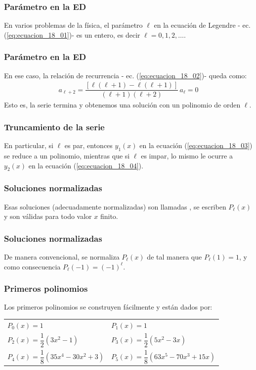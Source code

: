 \documentclass[12pt]{beamer}
\begin{document}
\begin{frame}
\frametitle{Parámetro en la ED}
En varios problemas de la física, el parámetro $\ell$ en la ecuación de Legendre - ec. (\ref{eq:ecuacion_18_01})- es un entero, es decir $\ell = 0,1,2,\ldots$.
\end{frame}
\begin{frame}
\frametitle{Parámetro en la ED}
En ese caso, la relación de recurrencia - ec. (\ref{eq:ecuacion_18_02})- queda como:
\pause
\begin{align*}
a_{\ell + 2} = \dfrac{[ \ell (\ell + 1) - \ell (\ell + 1) ]}{(\ell + 1)(\ell + 2)} \, a_{\ell} = 0
\end{align*}
Esto es, la serie termina y obtenemos una solución con un polinomio de orden $\ell$.
\end{frame}
\begin{frame}
\frametitle{Truncamiento de la serie}
En particular, si $\ell$ es par, entonces $y_{1} (x)$ en la ecuación (\ref{eq:ecuacion_18_03}) se reduce a un polinomio, \pause mientras que si $\ell$ es impar, lo mismo le ocurre a $y_{2} (x)$ en la ecuación (\ref{eq:ecuacion_18_04}).
\end{frame}
\begin{frame}
\frametitle{Soluciones normalizadas}
Esas soluciones (adecuadamente normalizadas) son llamadas , se escriben $P_{\ell} (x)$ y son válidas para todo valor $x$ finito.
\end{frame}
\begin{frame}
\frametitle{Soluciones normalizadas}
De manera convencional, se normaliza $P_{\ell} (x)$ de tal manera que $P_{\ell}(1) =  1$, y como consecuencia $P_{\ell} (-1) = (-1)^{\ell}$.
\end{frame}
\begin{frame}
\frametitle{Primeros polinomios}
Los primeros polinomios se construyen fácilmente y están dados por:
\pause
\vspace*{-1cm}
\begin{center}
\begin{tabular}{l l}
$P_{0} (x) {=} 1 $ & $P_{1}(x) {=} 1 $ \\[0.5em]
$P_{2} (x) {=} \dfrac{1}{2} (3 x^{2} {-} 1)$ & $P_{3} (x) {=} \dfrac{1}{2} (5 x^{2} {-} 3 x)$ \\[0.5em] 
$P_{4} (x) {=} \dfrac{1}{8} (35 x^{4} {-} 30 x^{2} {+} 3)$ & $P_{5} (x) {=} \dfrac{1}{8} (63 x^{5} {-} 70 x^{3} + 15 x)$
\end{tabular}
\end{center}
\end{frame}
\end{document}
